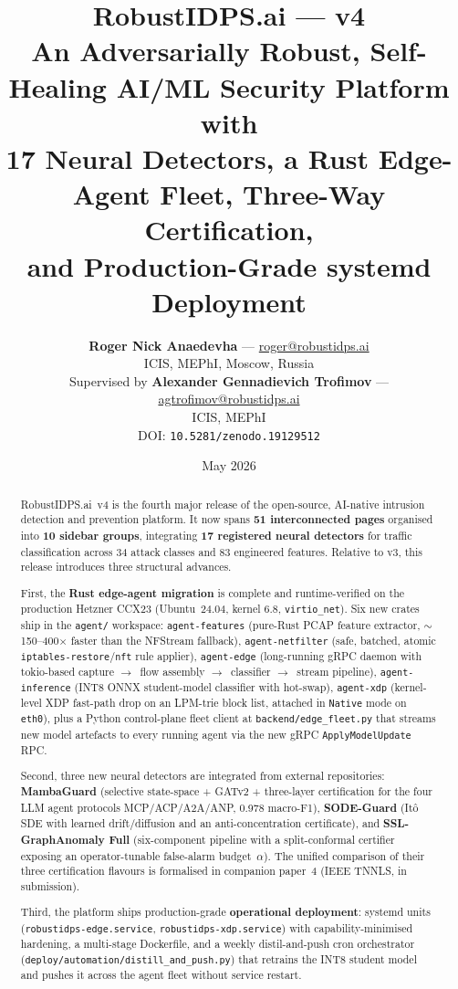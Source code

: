 \documentclass[11pt,a4paper]{article}
\title{%
  \vspace{-1cm}
  {\LARGE\bfseries RobustIDPS.ai --- v4}\\[6pt]
  {\large An Adversarially Robust, Self-Healing AI/ML Security Platform with\\
   17 Neural Detectors, a Rust Edge-Agent Fleet, Three-Way Certification,\\
   and Production-Grade systemd Deployment}}
\author{%
  \textbf{Roger Nick Anaedevha} --- \href{mailto:roger@robustidps.ai}{roger@robustidps.ai}\\
  ICIS, MEPhI, Moscow, Russia\\[6pt]
  Supervised by \textbf{Alexander Gennadievich Trofimov} --- \href{mailto:agtrofimov@robustidps.ai}{agtrofimov@robustidps.ai}\\
  ICIS, MEPhI\\[8pt]
  \normalsize DOI: \texttt{10.5281/zenodo.19129512}}
\date{May 2026}
\begin{document}
\maketitle
\thispagestyle{fancy}

\begin{abstract}
\noindent
RobustIDPS.ai~v4 is the fourth major release of the open-source, AI-native
intrusion detection and prevention platform.  It now spans \textbf{51
interconnected pages} organised into \textbf{10 sidebar groups},
integrating \textbf{17 registered neural detectors} for traffic
classification across 34 attack classes and 83 engineered features.
Relative to v3, this release introduces three structural advances.

First, the \textbf{Rust edge-agent migration} is complete and
runtime-verified on the production Hetzner CCX23 (Ubuntu~24.04, kernel
6.8, \texttt{virtio\_net}).  Six new crates ship in the
\texttt{agent/} workspace: \texttt{agent-features} (pure-Rust PCAP
feature extractor, $\sim$150--400$\times$ faster than the NFStream
fallback), \texttt{agent-netfilter} (safe, batched, atomic
\texttt{iptables-restore}/\texttt{nft} rule applier), \texttt{agent-edge}
(long-running gRPC daemon with tokio-based capture
$\to$~flow assembly $\to$~classifier $\to$~stream pipeline),
\texttt{agent-inference} (INT8 ONNX student-model classifier with hot-swap),
\texttt{agent-xdp} (kernel-level XDP fast-path drop on an LPM-trie block
list, attached in \texttt{Native} mode on \texttt{eth0}), plus a Python
control-plane fleet client at \texttt{backend/edge\_fleet.py} that streams
new model artefacts to every running agent via the new gRPC
\texttt{ApplyModelUpdate} RPC.

Second, three new neural detectors are integrated from external
repositories: \textbf{MambaGuard} (selective state-space + GATv2 +
three-layer certification for the four LLM agent protocols
MCP/ACP/A2A/ANP, 0.978 macro-F1), \textbf{SODE-Guard} (It\^o SDE with
learned drift/diffusion and an anti-concentration certificate), and
\textbf{SSL-GraphAnomaly Full} (six-component pipeline with a
split-conformal certifier exposing an operator-tunable false-alarm
budget~$\alpha$).  The unified comparison of their three certification
flavours is formalised in companion paper~4 (IEEE TNNLS, in submission).

Third, the platform ships production-grade \textbf{operational
deployment}: systemd units (\texttt{robustidps-edge.service},
\texttt{robustidps-xdp.service}) with capability-minimised hardening, a
multi-stage Dockerfile, and a weekly distil-and-push cron orchestrator\\
(\texttt{deploy/automation/distill\_and\_push.py}) that retrains the INT8
student model and pushes it across the agent fleet without service
restart.
\end{abstract}
\end{document}
